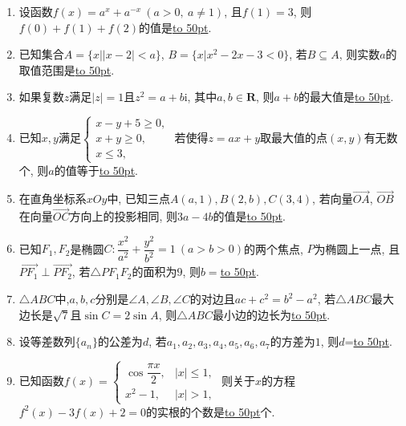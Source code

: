 \documentclass[10pt,a4paper]{article}
\newcommand{\blank}[1]{\underline{\hbox to #1pt{}}}
\begin{document}
\begin{enumerate}[1.]
\item 设函数$f(x)=a^x+a^{-x}  \ (a>0, \ a\ne 1)$, 且$f(1)=3$, 则$f(0)+f(1)+f(2)$的值是\blank{50}.
\item 已知集合$A=\{x||x-2|<a\}$, $B=\{x|x^2-2x-3<0\}$, 若$B\subseteq A$, 则实数$a$的取值范围是\blank{50}.
\item 如果复数$z$满足$|z|=1$且$z^2=a+b\mathrm{i}$, 其中$a,b\in \mathbf{R}$, 则$a+b$的最大值是\blank{50}.
\item 已知$x,y$满足$\begin{cases}
   x-y+5 \ge 0, \\ x+y\ge 0, \\ x\le 3, \end{cases}$ 若使得$z=ax+y$取最大值的点$(x,y)$有无数个, 则$a$的值等于\blank{50}.
\item 在直角坐标系$xOy$中, 已知三点$A(a,1),B(2,b),C(3,4)$, 若向量$\overrightarrow{OA}$, $\overrightarrow{OB}$在向量$\overrightarrow{OC}$方向上的投影相同, 则$3a-4b$的值是\blank{50}.
\item 已知$F_1,F_2$是椭圆$C:\dfrac{x^2}{a^2}+\dfrac{y^2}{b^2}=1\ (a>b>0)$的两个焦点, $P$为椭圆上一点, 且$\overrightarrow{PF_1}\perp \overrightarrow{PF_2}$, 若$\triangle PF_1F_2$的面积为$9$, 则$b=$\blank{50}.
\item$\triangle ABC$中,$a,b,c$分别是$\angle A,\angle B,\angle C$的对边且$ac+c^2=b^2-a^2$, 若$\triangle ABC$最大边长是$\sqrt7$且$\sin C=2\sin A$, 则$\triangle ABC$最小边的边长为\blank{50}.
\item 设等差数列$\{a_n\}$的公差为$d$, 若$a_1,a_2,a_3,a_4,a_5,a_6,a_7$的方差为$1$, 则$d$=\blank{50}.
\item 已知函数$f(x)=\begin{cases} \cos \dfrac{\pi x}2, & |x|\le 1,  \\ x^2-1, & |x|>1,  \end{cases}$ 则关于$x$的方程$f^2(x)-3f(x)+2=0$的实根的个数是\blank{50}个.




\end{enumerate}
\end{document}
